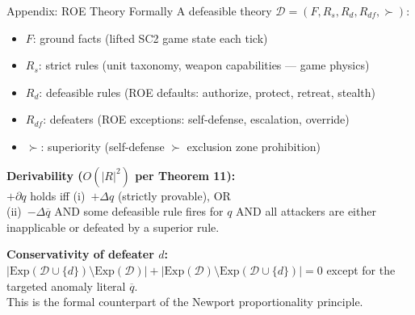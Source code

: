 \documentclass[aspectratio=169, 10pt]{beamer}
\newcommand{\D}{\mathcal{D}}
\begin{document}
\appendix

\begin{frame}{Appendix: ROE Theory Formally}
  \small
  A defeasible theory $\D = (F, R_s, R_d, R_{df}, {\succ})$:

  \begin{itemize}[leftmargin=1.2em, itemsep=3pt]
    \item $F$: ground facts (lifted SC2 game state each tick)
    \item $R_s$: strict rules (unit taxonomy, weapon capabilities --- game physics)
    \item $R_d$: defeasible rules (ROE defaults: authorize, protect, retreat, stealth)
    \item $R_{df}$: defeaters (ROE exceptions: self-defense, escalation, override)
    \item ${\succ}$: superiority (self-defense $\succ$ exclusion zone prohibition)
  \end{itemize}

  \vspace{0.4em}
  \textbf{Derivability ($O(|R|^2)$ per Theorem 11):}\\
  $+\partial q$ holds iff (i)~$+\Delta q$ (strictly provable), OR\\
  \phantom{$+\partial q$ holds iff }
  (ii)~$-\Delta\overline{q}$ AND some defeasible rule fires for $q$ AND
  all attackers are either inapplicable or defeated by a superior rule.

  \vspace{0.4em}
  \textbf{Conservativity of defeater $d$:}\\
  $|\mathrm{Exp}(\D \cup \{d\}) \setminus \mathrm{Exp}(\D)| +
   |\mathrm{Exp}(\D) \setminus \mathrm{Exp}(\D \cup \{d\})| = 0$
  except for the targeted anomaly literal $\overline{q}$.\\
  This is the formal counterpart of the Newport proportionality principle.
\end{frame}
\end{document}
